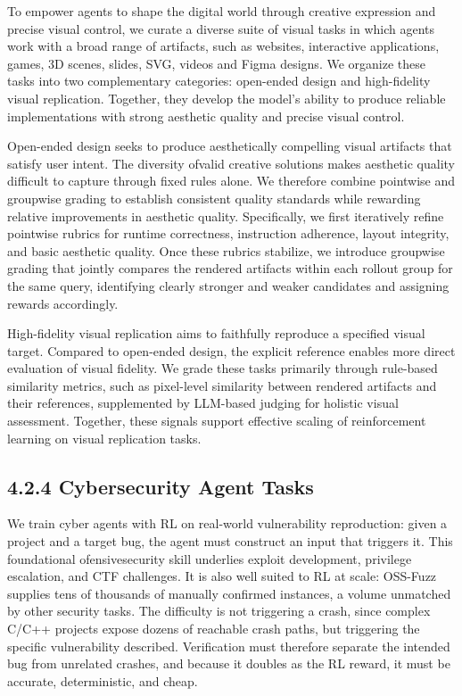 \documentclass[
  10
]{article}
\begin{document}
To empower agents to shape the digital world through creative expression
and precise visual control, we curate a diverse suite of visual tasks in
which agents work with a broad range of artifacts, such as websites,
interactive applications, games, 3D scenes, slides, SVG, videos and
Figma designs. We organize these tasks into two complementary
categories: open-ended design and high-fidelity visual replication.
Together, they develop the model's ability to produce reliable
implementations with strong aesthetic quality and precise visual
control.

Open-ended design seeks to produce aesthetically compelling visual
artifacts that satisfy user intent. The diversity ofvalid creative
solutions makes aesthetic quality difficult to capture through fixed
rules alone. We therefore combine pointwise and groupwise grading to
establish consistent quality standards while rewarding relative
improvements in aesthetic quality. Specifically, we first iteratively
refine pointwise rubrics for runtime correctness, instruction adherence,
layout integrity, and basic aesthetic quality. Once these rubrics
stabilize, we introduce groupwise grading that jointly compares the
rendered artifacts within each rollout group for the same query,
identifying clearly stronger and weaker candidates and assigning rewards
accordingly.

High-fidelity visual replication aims to faithfully reproduce a
specified visual target. Compared to open-ended design, the explicit
reference enables more direct evaluation of visual fidelity. We grade
these tasks primarily through rule-based similarity metrics, such as
pixel-level similarity between rendered artifacts and their references,
supplemented by LLM-based judging for holistic visual assessment.
Together, these signals support effective scaling of reinforcement
learning on visual replication tasks.

\subsection{4.2.4 Cybersecurity Agent
Tasks}\label{cybersecurity-agent-tasks}

We train cyber agents with RL on real-world vulnerability reproduction:
given a project and a target bug, the agent must construct an input that
triggers it. This foundational ofensivesecurity skill underlies exploit
development, privilege escalation, and CTF challenges. It is also well
suited to RL at scale: OSS-Fuzz supplies tens of thousands of manually
confirmed instances, a volume unmatched by other security tasks. The
difficulty is not triggering a crash, since complex C/C++ projects expose
dozens of reachable crash paths, but triggering the specific
vulnerability described. Verification must therefore separate the
intended bug from unrelated crashes, and because it doubles as the RL
reward, it must be accurate, deterministic, and cheap.
\end{document}
